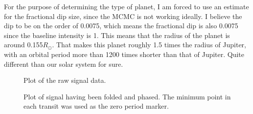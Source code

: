 \documentclass[twocolumn,11pt]{article}
\begin{document}
For the purpose of determining the type of planet, I am forced to use an estimate for the fractional dip size, since the MCMC is not working ideally. I believe the dip to be on the order of 0.0075, which means the fractional dip is also 0.0075 since the baseline intensity is 1. This means that the radius of the planet is around 0.155$R_{\odot}$. That makes this planet roughly 1.5 times the radius of Jupiter, with an orbital period more than 1200 times shorter than that of Jupiter. Quite different than our solar system for sure.


\begin{figure}[!h]
	\centering
	\noindent
      \caption{Plot of the raw signal data.}
\end{figure}

\begin{figure}[!h]
	\centering
	\noindent
      \caption{Plot of signal having been folded and phased. The minimum point in each transit was used as the zero period marker.}
\end{figure}
\end{document}
